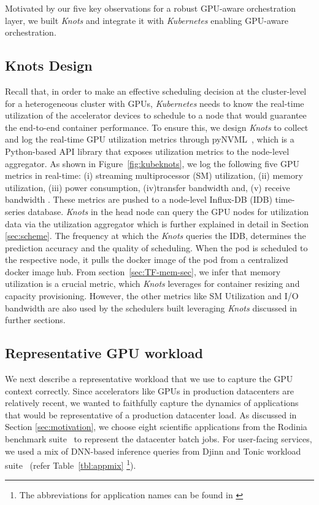 

Motivated by our five key observations for a robust GPU-aware orchestration layer, we built \textit{Knots} and integrate it with \textit{Kubernetes} enabling GPU-aware orchestration.

\subsection{Knots Design}
Recall that, in order to make an effective scheduling decision at the cluster-level for a heterogeneous cluster with GPUs, \textit{Kubernetes} needs to know the real-time utilization of the accelerator devices to schedule to a node that would guarantee the end-to-end container performance. To ensure this, we design \textit{Knots} to collect and log the real-time GPU utilization metrics through pyNVML~\cite{pynvml}, which is a Python-based API library that exposes utilization metrics to the node-level aggregator. As shown in Figure~\ref{fig:kubeknots}, we log the following five GPU metrics in real-time: (i) streaming multiprocessor (SM) utilization, (ii) memory utilization, (iii) power consumption, (iv)transfer bandwidth and, (v) receive bandwidth . These metrics are pushed to a node-level Influx-DB (IDB) \cite{InfluxDB} time-series database. \textit{Knots} in the head node can query the GPU nodes for utilization data via the utilization aggregator which is further explained in detail in Section \ref{sec:scheme}. The frequency at which the \textit{Knots} queries the IDB, determines the prediction accuracy and the quality of scheduling. When the pod is scheduled to the respective node, it pulls the docker image of the pod from a centralized docker image hub. From section~\ref{sec:TF-mem-sec}, we infer that memory utilization is a crucial metric, which \textit{Knots} leverages for container resizing and capacity provisioning. However, the other metrics like SM Utilization and I/O bandwidth are also used by the schedulers built leveraging \textit{Knots} discussed in further sections. 

\subsection{Representative GPU workload}
We next describe a representative workload that we use to capture the GPU context correctly. Since accelerators like GPUs in production datacenters are relatively recent, we wanted to faithfully capture the dynamics of applications that would be representative of a production datacenter load. As discussed in Section \ref{sec:motivation}, we choose eight scientific applications from the Rodinia benchmark suite~\cite{che2009rodinia} to represent the datacenter batch jobs. For user-facing services, we used a mix of DNN-based inference queries from Djinn and Tonic workload suite~\cite{hauswald2015djinn} (refer Table~\ref{tbl:appmix} \footnote{The abbreviations for application names can be found in \cite{hauswald2015djinn}}). 

